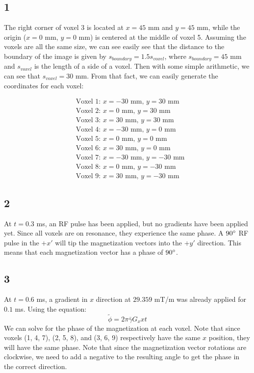 \documentclass{article}
\begin{document}
\subsection*{1}

The right corner of voxel 3 is located at $x = 45$ mm
and $y = 45$ mm, while the origin ($x = 0$ mm, $y = 0$ mm) is
centered at the middle of voxel 5. Assuming the voxels are all
the same size, we can see easily see that the distance to the boundary
of the image is given by $s_{boundary} = 1.5s_{voxel}$, where $s_{boundary} = 45$
mm and $s_{voxel}$ is the length of a side of a voxel. Then with
some simple arithmetic, we can see that $s_{voxel} = 30$ mm. From that fact,
we can easily generate the coordinates for each voxel:

\begin{align*}
    &\textrm{Voxel 1: } x = -30 \textrm{ mm, } y = 30 \textrm{ mm}\\
    &\textrm{Voxel 2: } x = 0 \textrm{ mm, } y = 30 \textrm{ mm}\\
    &\textrm{Voxel 3: } x = 30 \textrm{ mm, } y = 30 \textrm{ mm}\\
    &\textrm{Voxel 4: } x = -30 \textrm{ mm, } y = 0 \textrm{ mm}\\
    &\textrm{Voxel 5: } x = 0 \textrm{ mm, } y = 0 \textrm{ mm} \\
    &\textrm{Voxel 6: } x = 30 \textrm{ mm, } y = 0 \textrm{ mm}\\
    &\textrm{Voxel 7: } x = -30 \textrm{ mm, } y = -30 \textrm{ mm}\\
    &\textrm{Voxel 8: } x = 0 \textrm{ mm, } y = -30 \textrm{ mm}\\
    &\textrm{Voxel 9: } x = 30 \textrm{ mm, } y = -30 \textrm{ mm}
\end{align*}

\subsection*{2}
At $t = 0.3$ ms, an RF pulse has been applied, but no gradients have been applied yet. Since all voxels are on
resonance, they experience the same phase. A $90\degree$ RF pulse in the $+x'$ will tip the magnetization vectors into
the $+y'$ direction. This means that each magnetization vector has a phase of $90\degree$.

\subsection*{3}
At $t = 0.6$ ms, a gradient in $x$ direction at $29.359$ mT/m was already applied for $0.1$ ms. Using
the equation: \[ \tilde{\phi} = 2\pi \bar{\gamma}G_{x}xt \]
We can solve for the phase of the magnetization at each voxel. Note that since
voxels (1, 4, 7), (2, 5, 8), and (3, 6, 9) respectively have the
same $x$ position, they will have the same phase. Note that since the magnetization vector rotations are clockwise, we
need to add a negative to the resulting angle to get the phase in the correct direction.  
\end{document}
